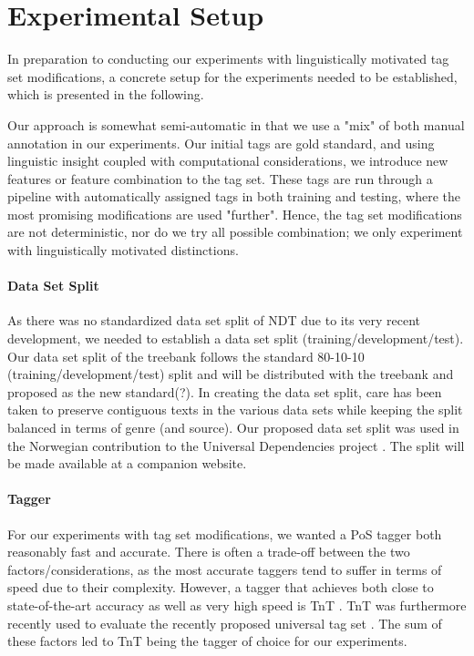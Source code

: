 \documentclass[11pt,a4paper]{article}
\begin{document}
\section{Experimental Setup}
\label{sec:setup}
In preparation to conducting our experiments with linguistically motivated tag
set modifications, a concrete setup for the experiments needed to be
established, which is presented in the following.

Our approach is somewhat semi-automatic in that we use a "mix" of both manual
annotation in our experiments. Our initial tags are gold standard, and using
linguistic insight coupled with computational considerations, we introduce new
features or feature combination to the tag set. These tags are run through a
pipeline with automatically assigned tags in both training and testing, where
the most promising modifications are used "further". Hence, the tag set
modifications are not deterministic, nor do we try all possible combination; we
only experiment with linguistically motivated distinctions.

\paragraph{Data Set Split}
As there was no standardized data set split of NDT due to its very recent
development, we needed to establish a data set split
(training/development/test). Our data set split of the treebank follows the
standard 80-10-10 (training/development/test) split and will be distributed
with the treebank and proposed as the new standard(?). In creating the data set
split, care has been taken to preserve contiguous texts in the various data
sets while keeping the split balanced in terms of genre (and source). Our
proposed data set split was used in the Norwegian contribution to the Universal
Dependencies project \cite{Ovr:Hoh:16}.  The split will be made available at a
companion website.

\paragraph{Tagger}
For our experiments with tag set modifications, we wanted a PoS tagger both
reasonably fast and accurate. There is often a trade-off between the two
factors/considerations, as the most accurate taggers tend to suffer in terms of
speed due to their complexity. However, a tagger that achieves both close to
state-of-the-art accuracy as well as very high speed is TnT \cite{Bra:00}. TnT
was furthermore recently used to evaluate the recently proposed universal tag
set \cite{Pet:Das:McD:12}. The sum of these factors led to TnT being the tagger
of choice for our experiments.
\end{document}

